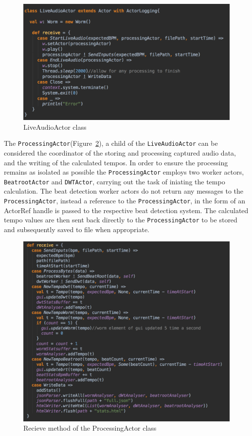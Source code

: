 \documentclass[a4paper, 11pt]{article}
\begin{document}
\begin{figure}[h]
\centering
\includegraphics[scale=0.3]{images/LiveAudioActor.jpg}
\caption{LiveAudioActor class}
\label{fig: liveaudioactor}
\end{figure}

The \texttt{ProcessingActor}(Figure~\ref{fig: processingActor}), a child of the \texttt{LiveAudioActor} can be considered the coordinator of the storing and processing captured audio data, and the writing of the calculated tempos. In order to ensure the processing remains as isolated as possible the \texttt{ProcessingActor} employs two worker actors, \texttt{BeatrootActor} and \texttt{DWTActor}, carrying out the task of iniating the tempo calculation. The beat detection worker actors do not return any messages to the \texttt{ProcessingActor}, instead a reference to the \texttt{ProcessingActor}, in the form of an ActorRef handle is passed to the respective beat detection system. The calculated tempo values are then sent back directly to the \texttt{ProcessingActor} to be stored and subsequently saved to file when appropriate.\par

\begin{figure}[h]
\centering
\includegraphics[scale=0.3]{images/processingRec.jpg}
\caption{Recieve method of the ProcessingActor class}
\label{fig: processingActor}
\end{figure}
\end{document}
